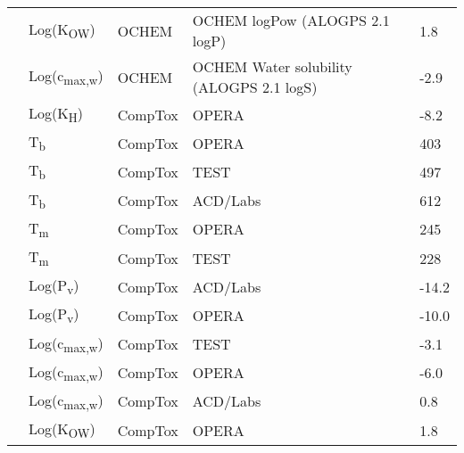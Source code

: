 \begin{landscape}
\begin{longtable}[c]{lllll}
          & Log(K\textsubscript{OW})      & OCHEM      & OCHEM logPow (ALOGPS 2.1 logP)                                                  & 1.8   \\
          & Log(c\textsubscript{max,w}) & OCHEM      & OCHEM Water solubility (ALOGPS 2.1 logS)                                        & -2.9  \\
          & Log(K\textsubscript{H})       & CompTox    & OPERA                                                                           & -8.2  \\
          & T\textsubscript{b}          & CompTox    & OPERA                                                                           & 403   \\
          & T\textsubscript{b}          & CompTox    & TEST                                                                            & 497   \\
      & T\textsubscript{b}          & CompTox    & ACD/Labs                                                                        & 612   \\
          & T\textsubscript{m}          & CompTox    & OPERA                                                                           & 245   \\
          & T\textsubscript{m}          & CompTox    & TEST                                                                            & 228   \\
          & Log(P\textsubscript{v})       & CompTox    & ACD/Labs                                                                        & -14.2 \\
          & Log(P\textsubscript{v})       & CompTox    & OPERA                                                                           & -10.0 \\
          & Log(c\textsubscript{max,w}) & CompTox    & TEST                                                                            & -3.1  \\
          & Log(c\textsubscript{max,w}) & CompTox    & OPERA                                                                           & -6.0  \\
          & Log(c\textsubscript{max,w}) & CompTox    & ACD/Labs                                                                        & 0.8   \\
          & Log(K\textsubscript{OW})      & CompTox    & OPERA                                                                           & 1.8   \\

\end{longtable}
\end{landscape}
